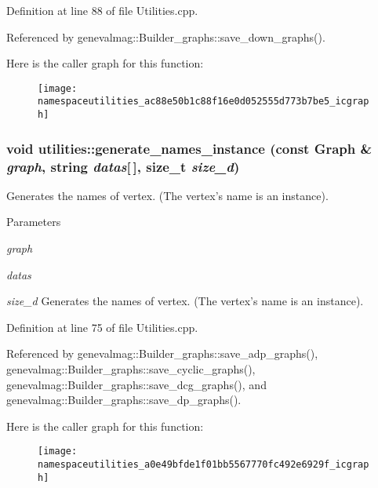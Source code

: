 Definition at line 88 of file Utilities.cpp.



Referenced by genevalmag::Builder\_\-graphs::save\_\-down\_\-graphs().



Here is the caller graph for this function:\nopagebreak
\begin{figure}[H]
\begin{center}
\leavevmode
\texttt{[image: namespaceutilities\_ac88e50b1c88f16e0d052555d773b7be5\_icgraph]}
\end{center}
\end{figure}


\hypertarget{namespaceutilities_a0e49bfde1f01bb5567770fc492e6929f}{
\subsubsection[{generate\_\-names\_\-instance}]{\setlength{\rightskip}{0pt plus 5cm}void utilities::generate\_\-names\_\-instance (const Graph \& {\em graph}, \/  string {\em datas}\mbox{[}$\,$\mbox{]}, \/  size\_\-t {\em size\_\-d})}}
\label{namespaceutilities_a0e49bfde1f01bb5567770fc492e6929f}
Generates the names of vertex. (The vertex's name is an instance). 
\begin{DoxyParams}{Parameters}
\item[{\em graph}]\item[{\em datas}]\item[{\em size\_\-d}]Generates the names of vertex. (The vertex's name is an instance). \end{DoxyParams}


Definition at line 75 of file Utilities.cpp.



Referenced by genevalmag::Builder\_\-graphs::save\_\-adp\_\-graphs(), genevalmag::Builder\_\-graphs::save\_\-cyclic\_\-graphs(), genevalmag::Builder\_\-graphs::save\_\-dcg\_\-graphs(), and genevalmag::Builder\_\-graphs::save\_\-dp\_\-graphs().



Here is the caller graph for this function:\nopagebreak
\begin{figure}[H]
\begin{center}
\leavevmode
\texttt{[image: namespaceutilities\_a0e49bfde1f01bb5567770fc492e6929f\_icgraph]}
\end{center}
\end{figure}


